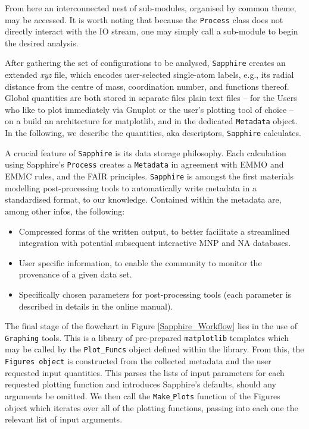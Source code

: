 From here an interconnected nest of sub-modules, organised by common theme, may be accessed. It is worth noting that because the \texttt{Process} class does not directly interact with the IO stream, one may simply call a sub-module to begin the desired analysis.

After gathering the set of configurations to be analysed, \texttt{Sapphire} creates an extended \textit{xyz} file, which encodes user-selected single-atom labels, e.g., its radial distance from the centre of mass, coordination number, and functions thereof. 
Global quantities are both stored in separate files plain text files -- for the Users who like to plot immediately via Gnuplot or the user's plotting tool of choice --  on a  build an architecture for matplotlib, and in the dedicated \texttt{Metadata} object. 
In the following, we describe the quantities, aka descriptors, \texttt{Sapphire} calculates. 
%

A crucial feature of \texttt{Sapphire} is its data storage philosophy. 
Each calculation using Sapphire's \texttt{Process} creates a \texttt{Metadata} in agreement with EMMO \cite{EMMO} and EMMC \cite{EMMC} rules, and the FAIR \cite{https://doi.org/10.48550/arxiv.1805.05039} principles. 
%
\texttt{Sapphire} is amongst the first materials modelling post-processing tools to automatically write metadata in a standardised format, to our knowledge.
%
Contained within the metadata are, among other infos, the following: 
\begin{itemize}
    \item Compressed forms of the written output, to better facilitate a streamlined integration with potential subsequent interactive MNP and NA databases.
    \item User specific information, to enable the community to monitor the provenance of a given data set.
    \item Specifically chosen parameters for post-processing tools (each parameter is described in details in the online manual).
\end{itemize}
%

The final stage of the flowchart in Figure \ref{Sapphire_Workflow} lies in the use of \texttt{Graphing} tools. 
This is a library of pre-prepared \texttt{matplotlib} templates which may be called by the \texttt{Plot\_Funcs} object defined within the library. 
From this, the \texttt{Figures object} is constructed from the collected metadata and the user requested input quantities.
%
This parses the lists of input parameters for each requested plotting function and introduces Sapphire's defaults, should any arguments be omitted. 
%
We then call the \texttt{Make$\_$Plots} function of the Figures object which iterates over all of the plotting functions, passing into each one the relevant list of input arguments.

